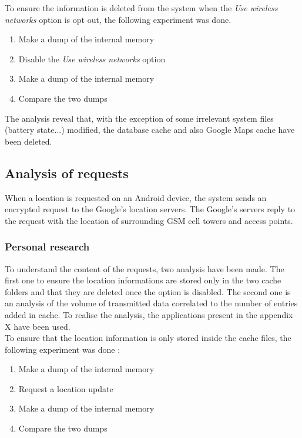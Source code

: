 To ensure the information is deleted from the system when the \emph{Use wireless networks} option is opt out, the following experiment was done.

\begin{enumerate}
\item Make a dump of the internal memory
\item Disable the \emph{Use wireless networks} option
\item Make a dump of the internal memory
\item Compare the two dumps
\end{enumerate}

The analysis reveal that, with the exception of some irrelevant system files (battery state...) modified, the database cache and also Google Maps cache have been deleted.\\


\subsection{Analysis of requests}

When a location is requested on an Android device, the system sends an encrypted request to the Google's location servers. The Google's servers reply to the request with the location of surrounding GSM cell towers and access points.\\


\subsubsection{Personal research}

To understand the content of the requests, two analysis have been made. The first one to ensure the location informations are stored only in the two cache folders and that they are deleted once the option is disabled. The second one is an analysis of the volume of transmitted data correlated to the number of entries added in cache. To realise the analysis, the applications present in the appendix X have been used.\\

To ensure that the location information is only stored inside the cache files, the following experiment was done :
\begin{enumerate}
\item Make a dump of the internal memory
\item Request a location update
\item Make a dump of the internal memory
\item Compare the two dumps
\end{enumerate}

